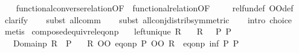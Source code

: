 \begin{isabellebody}
%
\isadelimproof
\ \ %
\endisadelimproof
%
\isatagproof
{}\isamarkupfalse%
\ functional{\isacharunderscore}{\kern0pt}converse{\isacharunderscore}{\kern0pt}relation{\isacharbrackleft}{\kern0pt}OF\ {}{\isacharbrackright}{\kern0pt}\ functional{\isacharunderscore}{\kern0pt}relation{\isacharbrackleft}{\kern0pt}OF\ {}{\isacharbrackright}{\kern0pt}\isanewline
\ \ \isamarkupfalse%
\ rel{\isacharunderscore}{\kern0pt}fun{\isacharunderscore}{\kern0pt}def\ OO{\isacharunderscore}{\kern0pt}def\isanewline
\ \ \isamarkupfalse%
\ clarify\isanewline
\ \ \isamarkupfalse%
\ {\isacharparenleft}{\kern0pt}subst\ all{\isacharunderscore}{\kern0pt}comm{\isacharparenright}{\kern0pt}\isanewline
\ \ \isamarkupfalse%
\ {\isacharparenleft}{\kern0pt}subst\ all{\isacharunderscore}{\kern0pt}conj{\isacharunderscore}{\kern0pt}distrib{\isacharbrackleft}{\kern0pt}symmetric{\isacharbrackright}{\kern0pt}{\isacharparenright}{\kern0pt}\isanewline
\ \ \isamarkupfalse%
\ {\isacharparenleft}{\kern0pt}intro\ choice{\isacharparenright}{\kern0pt}\isanewline
\ \ \isamarkupfalse%
\ metis%
\endisatagproof
{\isafoldproof}%
%
\isadelimproof
%
\endisadelimproof
%
\isadelimdocument
%
\endisadelimdocument
%
\isatagdocument
%
\isamarkuptrue%
%
\endisatagdocument
{\isafolddocument}%
%
\isadelimdocument
%
\endisadelimdocument
{}\isamarkupfalse%
\ composed{\isacharunderscore}{\kern0pt}equiv{\isacharunderscore}{\kern0pt}rel{\isacharunderscore}{\kern0pt}eq{\isacharunderscore}{\kern0pt}onp{\isacharcolon}{\kern0pt}\isanewline
\ \ \ {\isachardoublequoteopen}left{\isacharunderscore}{\kern0pt}unique\ R{\isachardoublequoteclose}\isanewline
\ \ \ {\isachardoublequoteopen}{\isacharparenleft}{\kern0pt}R\ {\isacharequal}{\kern0pt}{\isacharequal}{\kern0pt}{\isacharequal}{\kern0pt}{\isachargreater}{\kern0pt}\ {\isacharparenleft}{\kern0pt}{\isacharequal}{\kern0pt}{\isacharparenright}{\kern0pt}{\isacharparenright}{\kern0pt}\ P\ P{\isacharprime}{\kern0pt}{\isachardoublequoteclose}\isanewline
\ \ \ {\isachardoublequoteopen}Domainp\ R\ {\isacharequal}{\kern0pt}\ P{\isacharprime}{\kern0pt}{\isacharprime}{\kern0pt}{\isachardoublequoteclose}\isanewline
\ \ \ {\isachardoublequoteopen}{\isacharparenleft}{\kern0pt}R\ OO\ eq{\isacharunderscore}{\kern0pt}onp\ P{\isacharprime}{\kern0pt}\ OO\ R{\isasyminverse}{\isasyminverse}{\isacharparenright}{\kern0pt}\ {\isacharequal}{\kern0pt}\ eq{\isacharunderscore}{\kern0pt}onp\ {\isacharparenleft}{\kern0pt}inf\ P{\isacharprime}{\kern0pt}{\isacharprime}{\kern0pt}\ P{\isacharparenright}{\kern0pt}{\isachardoublequoteclose}\isanewline

\end{isabellebody}

